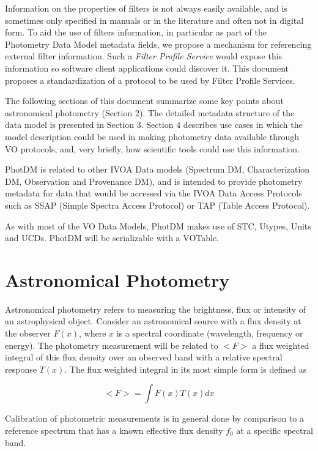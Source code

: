 \documentclass[11pt,a4paper]{ivoa}
\begin{document}
Information on the properties of filters is not always easily available, and is sometimes only specified in manuals or in the literature and often not in digital form. To aid the use of filters information, in particular as part of the Photometry Data Model metadata fields, we propose a mechanism for referencing external filter information. Such a \textit{Filter Profile Service} would expose this information so software client applications could discover it. This document proposes a standardization of a protocol to be used by Filter Profile Services.
\par

The following sections of this document summarize some key points about astronomical photometry (Section 2). The detailed metadata structure of the data model is presented in Section 3. Section 4 describes use cases in which the model description could be used in making photometry data available through VO protocols, and, very briefly, how scientific tools could use this information. 
\par

PhotDM is related to other IVOA Data models (Spectrum DM, Characterization DM, Observation and Provenance DM),  and is intended to provide photometry metadata for data that would be accessed via the IVOA Data Access Protocols such as SSAP (Simple Spectra Access Protocol) or TAP (Table Access Protocol).
\par

As with most of the VO Data Models, PhotDM makes use of STC, Utypes, Units and UCDs. PhotDM will be serializable with a VOTable.
\par

\section{Astronomical Photometry}
Astronomical photometry refers to measuring the brightness, flux or intensity of an astrophysical object. Consider an astronomical source with a flux density at the observer $F(x)$, where $x$ is a spectral coordinate (wavelength, frequency or energy).  The photometry measurement will be related to $<F>$ a flux weighted integral of this flux density over an observed band with a relative spectral response $T(x)$. The flux weighted integral in its most simple form is defined as
\par

\[ <F> = \int F(x)T(x)dx \]

Calibration of photometric measurements is in general done by comparison to a reference spectrum that has a known effective flux density $f_0$ at a specific spectral band. 
\par
\end{document}
